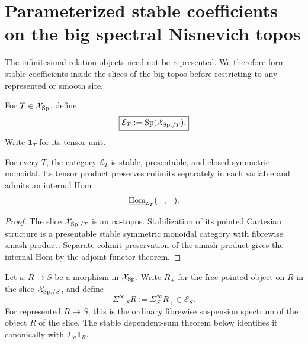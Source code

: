 \section{Parameterized stable coefficients on the big spectral Nisnevich topos}
\label{sec:monadic-de-rham-parameterized}

The infinitesimal relation objects need not be represented.  We therefore form stable coefficients
inside the slices of the big topos before restricting to any represented or smooth site.

\begin{definition}
\label{def:monadic-de-rham-parameterized}
For \(T\in\mathcal X_{\mathrm{Sp}}\), define
\[
\boxed{
    \mathcal E_T:=\mathrm{Sp}(\mathcal X_{\mathrm{Sp},/T}).
}
\]
Write \(\mathbf 1_T\) for its tensor unit.
\end{definition}

\begin{proposition}
\label{prop:monadic-de-rham-stable-presentable}
For every \(T\), the category \(\mathcal E_T\) is stable, presentable, and closed symmetric
monoidal.  Its tensor product preserves colimits separately in each variable and admits an internal
Hom
\[
    \underline{\operatorname{Hom}}_{\mathcal E_T}(-,-).
\]
\end{proposition}

\begin{proof}
The slice \(\mathcal X_{\mathrm{Sp},/T}\) is an \(\infty\)-topos.  Stabilization of its pointed Cartesian
structure is a presentable stable symmetric monoidal category with fibrewise smash product.
Separate colimit preservation of the smash product gives the internal Hom by the adjoint functor
theorem.
\end{proof}

\begin{construction}
Let \(a:R\to S\) be a morphism in \(\mathcal X_{\mathrm{Sp}}\).  Write \(R_+\) for the free pointed object
on \(R\) in the slice \(\mathcal X_{\mathrm{Sp},/S}\), and define
\[
\boxed{
    \Sigma^\infty_{+,S}R
    :=
    \Sigma^\infty_S R_+
    \in\mathcal E_S.
}
\]
For represented \(R\to S\), this is the ordinary fibrewise suspension spectrum of the object
\(R\) of the slice.  The stable dependent-sum theorem below identifies it canonically with
\(\Sigma_a\mathbf 1_R\).
\end{construction}

